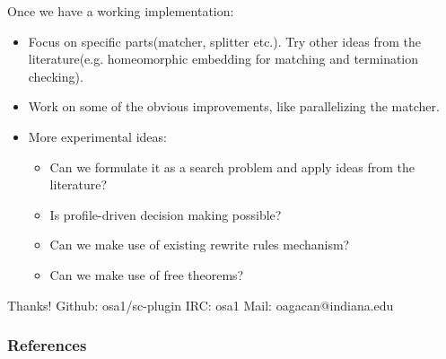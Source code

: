 \documentclass{beamer}
\begin{document}
\begin{frame}
    Once we have a working implementation:
    \begin{itemize}
        \item
            Focus on specific parts(matcher, splitter etc.). Try other ideas
            from the literature(e.g. homeomorphic embedding for matching and
            termination checking).
        \item
            Work on some of the obvious improvements, like parallelizing
            the matcher.
        \item
            More experimental ideas:
            \begin{itemize}
                \item[]
                    Can we formulate it as a search problem and apply ideas from
                    the literature?
                \item[]
                    Is profile-driven decision making possible?
                \item[]
                    Can we make use of existing rewrite rules mechanism?
                \item[]
                    Can we make use of free theorems?
            \end{itemize}
    \end{itemize}

    \bigskip
    Thanks!
    \newline
    Github: osa1/sc-plugin \hspace{0.3cm} IRC: osa1 \hspace{0.3cm} Mail:
    oagacan@indiana.edu
\end{frame}

\begin{frame}[allowframebreaks]
    \frametitle{References}

    
    
\end{frame}
\end{document}
